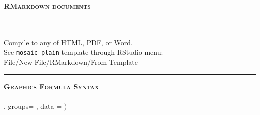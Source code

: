 \documentclass{article}\usepackage[]{graphicx}\usepackage[]{color}
\newcommand{\Wspace}{{\tiny\color{white}.}\hfill}
\newcommand{\NewSection}[1]{{\noindent\color{blue}\bfseries\scshape#1}}
\begin{document}
\NewSection{RMarkdown documents}\\
\\
\hbox{ \hfill {}}\\
\begin{small}%
\noindent Compile to any of HTML, PDF, or Word.\\
See \texttt{mosaic plain} template through RStudio menu:\\ 
{\sc File/New File/RMarkdown/From Template}
\end{small}%

\newpage
\hrule\vspace*{1mm}%
\NewSection{Graphics Formula Syntax}\\
\\\Wspace 
  {\sf groups= , data =  $\Big)$}
\end{document}
